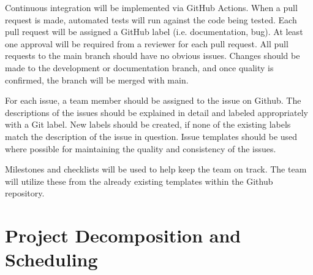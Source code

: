 \documentclass{article}
\begin{document}
Continuous integration will be implemented via GitHub Actions. When a pull request is made, automated
tests will run against the code being tested.
Each pull request will be assigned a GitHub label (i.e. documentation, bug). At least one
approval will be required from a reviewer for each pull request.
All pull requests to the main branch should have no obvious issues. Changes should be made
to the development or documentation branch, and once quality is confirmed, the branch will
be merged with main.\newline

For each issue, a team member should be assigned to the issue on Github. The descriptions
of the issues should be explained in detail and labeled appropriately with a Git label. New labels
should be created, if none of the existing labels match the description of the issue in question.
Issue templates should be used where possible for maintaining the quality and consistency of the
issues.\newline

Milestones and checklists will be used to help keep the team on track. The team will
utilize these from the already existing templates within the Github repository.

\section{Project Decomposition and Scheduling}
\end{document}
